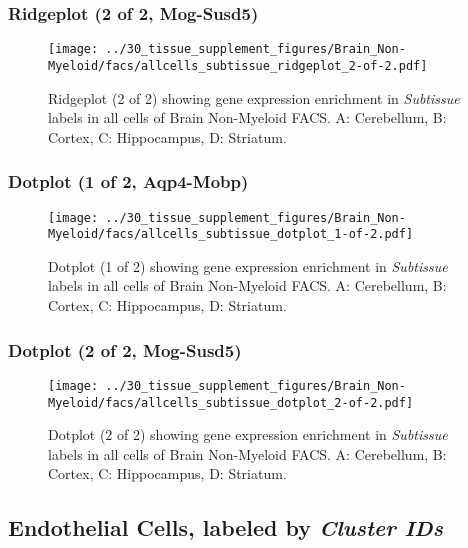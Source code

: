 \clearpage

\subsubsection{Ridgeplot (2 of 2, Mog-Susd5)}
\begin{figure}[h]
\centering
\texttt{[image: ../30\_tissue\_supplement\_figures/Brain\_Non-Myeloid/facs/allcells\_subtissue\_ridgeplot\_2-of-2.pdf]}

\caption{ Ridgeplot (2 of 2)  showing gene expression enrichment in \emph{Subtissue} labels in all cells of Brain Non-Myeloid FACS. A: Cerebellum, B: Cortex, C: Hippocampus, D: Striatum.}
\end{figure}


\clearpage

\subsubsection{Dotplot (1 of 2, Aqp4-Mobp)}
\begin{figure}[h]
\centering
\texttt{[image: ../30\_tissue\_supplement\_figures/Brain\_Non-Myeloid/facs/allcells\_subtissue\_dotplot\_1-of-2.pdf]}

\caption{ Dotplot (1 of 2)  showing gene expression enrichment in \emph{Subtissue} labels in all cells of Brain Non-Myeloid FACS. A: Cerebellum, B: Cortex, C: Hippocampus, D: Striatum.}
\end{figure}


\clearpage

\subsubsection{Dotplot (2 of 2, Mog-Susd5)}
\begin{figure}[h]
\centering
\texttt{[image: ../30\_tissue\_supplement\_figures/Brain\_Non-Myeloid/facs/allcells\_subtissue\_dotplot\_2-of-2.pdf]}

\caption{ Dotplot (2 of 2)  showing gene expression enrichment in \emph{Subtissue} labels in all cells of Brain Non-Myeloid FACS. A: Cerebellum, B: Cortex, C: Hippocampus, D: Striatum.}
\end{figure}


\clearpage

\subsection{Endothelial Cells, labeled by \emph{Cluster IDs}}
